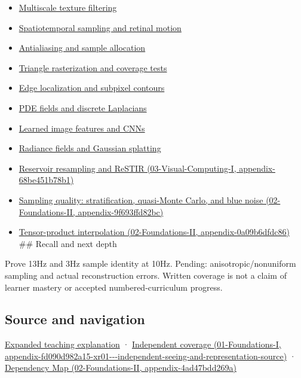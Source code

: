 \begin{itemize}
\item
  \hyperref[appendix-b677a85ba76f]{Multiscale texture filtering}
\item
  \hyperref[appendix-70895739febb]{Spatiotemporal sampling and retinal motion}
\item
  \hyperref[appendix-4192b2bdd21e]{Antialiasing and sample allocation}
\item
  \hyperref[appendix-ed3f9bc298fe]{Triangle rasterization and coverage tests}
\item
  \hyperref[appendix-36022286b03e]{Edge localization and subpixel contours}
\item
  \hyperref[appendix-1988d465c119]{PDE fields and discrete Laplacians}
\item
  \hyperref[appendix-47c51ea026fb]{Learned image features and CNNs}
\item
  \hyperref[appendix-c5b332e400e7]{Radiance fields and Gaussian splatting}
\item
  \href{../03-Visual-Computing-I/main.pdf\#nameddest=appendix-68be451b78b1}{Reservoir resampling and ReSTIR (03-Visual-Computing-I, appendix-68be451b78b1)}
\item
  \href{../02-Foundations-II/main.pdf\#nameddest=appendix-9f693ffd82bc}{Sampling quality: stratification, quasi-Monte Carlo, and blue noise (02-Foundations-II, appendix-9f693ffd82bc)}
\item
  \href{../02-Foundations-II/main.pdf\#nameddest=appendix-0a09b6dfdc86}{Tensor-product interpolation (02-Foundations-II, appendix-0a09b6dfdc86)} \#\# Recall and next depth
\end{itemize}

Prove 13Hz and 3Hz sample identity at 10Hz. Pending: anisotropic/nonuniform sampling and actual reconstruction errors. Written coverage is not a claim of learner mastery or accepted numbered-curriculum progress.

\subsection{Source and navigation}\label{appendix-6a7869dd79a6-source-and-navigation}

\hyperref[04-visual-computing-ii-ch042-sampling-is-a-question-of-what-remains-distinguishable]{Expanded teaching explanation} · \href{../01-Foundations-I/main.pdf\#nameddest=appendix-fd090d982a15-xr01---independent-seeing-and-representation-source}{Independent coverage (01-Foundations-I, appendix-fd090d982a15-xr01-\/-\/-independent-seeing-and-representation-source)} · \href{../02-Foundations-II/main.pdf\#nameddest=appendix-4ad47bdd269a}{Dependency Map (02-Foundations-II, appendix-4ad47bdd269a)}

